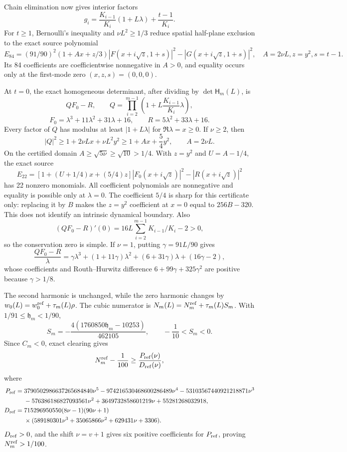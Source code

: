 \documentclass[10pt]{article}
\begin{document}
Chain elimination now gives interior factors
\[
g_i=\frac{K_{i-1}}{K_i}(1+L\lambda)+\frac{t-1}{K_i}.
\]
For $t\ge1$, Bernoulli's inequality and $\nu L^2\ge1/3$ reduce spatial
half-plane exclusion to the exact source polynomial
\[
E_{84}=(91/90)^2(1+Ax+z/3)|F(x+i\sqrt z,1+s)|^2
-|G(x+i\sqrt z,1+s)|^2,
\quad A=2\nu L, z=y^2, s=t-1.
\]
Its 84 coefficients are coefficientwise nonnegative in $A>0$, and equality
occurs only at the first-mode zero $(x,z,s)=(0,0,0)$.

At $t=0$, the exact homogeneous determinant, after dividing by
$\det\mathsf H_m(L)$, is
\[
 QF_0-R,\qquad
 Q=\prod_{i=2}^{m-1}\left(1+L\frac{K_{i-1}}{K_i}\lambda\right),
\]
\[
 F_0=\lambda^3+11\lambda^2+31\lambda+16,
 \qquad R=5\lambda^2+33\lambda+16.
\]
Every factor of $Q$ has modulus at least $|1+L\lambda|$ for
$\Re\lambda=x\ge0$.  If $\nu\ge2$, then
\[
 |Q|^2\ge1+2\nu Lx+\nu L^2y^2
 \ge1+Ax+\frac54y^2,\qquad A=2\nu L.
\]
On the certified domain $A\ge\sqrt{5\nu}\ge\sqrt{10}>1/4$.
With $z=y^2$ and $U=A-1/4$, the exact source
\[
E_{22}=\left[1+(U+1/4)x+(5/4)z\right]|F_0(x+i\sqrt z)|^2
-|R(x+i\sqrt z)|^2
\]
has 22 nonzero monomials.  All coefficient polynomials are nonnegative and
equality is possible only at $\lambda=0$.  The coefficient $5/4$ is sharp for
this certificate only: replacing it by $B$ makes the $z=y^2$ coefficient at
$x=0$ equal to $256B-320$.  This does not identify an intrinsic dynamical
boundary.  Also
\[
 (QF_0-R)'(0)=16L\sum_{i=2}^{m-1}K_{i-1}/K_i-2>0,
\]
so the conservation zero is simple.  If $\nu=1$, putting
$\gamma=91L/90$ gives
\[
 \frac{QF_0-R}{\lambda}
 =\gamma\lambda^3+(1+11\gamma)\lambda^2
 +(6+31\gamma)\lambda+(16\gamma-2),
\]
whose coefficients and Routh--Hurwitz difference
$6+99\gamma+325\gamma^2$ are positive because $\gamma>1/8$.

The second harmonic is unchanged, while the zero harmonic changes by
$w_0(L)=w_0^{\rm ref}+\tau_m(L)\rho$. The cubic numerator is
$N_m(L)=N_m^{\rm ref}+\tau_m(L)S_m$.  With
$1/91\le\mathfrak h_m<1/90$,
\[
S_m=-\frac{4(1760850\mathfrak h_m-10253)}{462105},
\qquad -\frac1{10}<S_m<0.
\]
Since $C_m<0$, exact clearing gives
\[
N_m^{\rm ref}-\frac1{100}\ge\frac{P_{\rm ref}(\nu)}{D_{\rm ref}(\nu)},
\]
where
\begin{align*}
P_{\rm ref}={}&3790502986637265684840\nu^5
-974216530468600286489\nu^4-53103567440921218871\nu^3\\
&-576386186827093561\nu^2+3649732858601219\nu+55281268032918,\\
D_{\rm ref}={}&715296950550(8\nu-1)(90\nu+1)\\
&\times(589180301\nu^3+35065866\nu^2+629431\nu+3306).
\end{align*}
$D_{\rm ref}>0$, and the shift $\nu=v+1$ gives six positive coefficients for
$P_{\rm ref}$, proving $N_m^{\rm ref}>1/100$.
\end{document}
